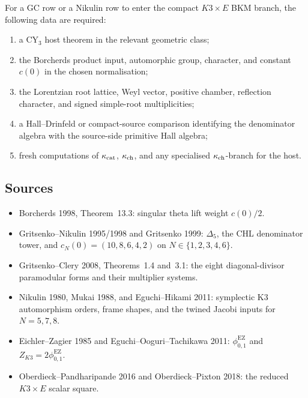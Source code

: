 For a GC row or a Nikulin row to enter the compact $K3\times E$ BKM
branch, the following data are required:
\begin{enumerate}[label=\textup{(\roman*)}, leftmargin=1.8em]
\item a CY$_3$ host theorem in the relevant geometric class;
\item the Borcherds product input, automorphic group, character, and
  constant $c(0)$ in the chosen normalisation;
\item the Lorentzian root lattice, Weyl vector, positive chamber,
  reflection character, and signed simple-root multiplicities;
\item a Hall--Drinfeld or compact-source comparison identifying the
  denominator algebra with the source-side primitive Hall algebra;
\item fresh computations of $\kappa_{\mathrm{cat}}$, $\kappa_{\mathrm{ch}}$, and any specialised
  $\kappa_{\mathrm{ch}}$-branch for the host.
\end{enumerate}

\subsection*{Sources}

\begin{itemize}[leftmargin=1.5em]
\item Borcherds 1998, Theorem~13.3: singular theta lift weight
  $c(0)/2$.
\item Gritsenko--Nikulin 1995/1998 and Gritsenko 1999:
  $\Delta_5$, the CHL denominator tower, and
  $c_N(0)=(10,8,6,4,2)$ on $N\in\{1,2,3,4,6\}$.
\item Gritsenko--Clery 2008, Theorems~1.4 and~3.1:
  the eight diagonal-divisor paramodular forms and their multiplier
  systems.
\item Nikulin 1980, Mukai 1988, and Eguchi--Hikami 2011:
  symplectic K3 automorphism orders, frame shapes, and the twined
  Jacobi inputs for $N=5,7,8$.
\item Eichler--Zagier 1985 and Eguchi--Ooguri--Tachikawa 2011:
  $\phi_{0,1}^{\mathrm{EZ}}$ and $Z_{K3}=2\phi_{0,1}^{\mathrm{EZ}}$.
\item Oberdieck--Pandharipande 2016 and Oberdieck--Pixton 2018:
  the reduced $K3\times E$ scalar square.
\end{itemize}
